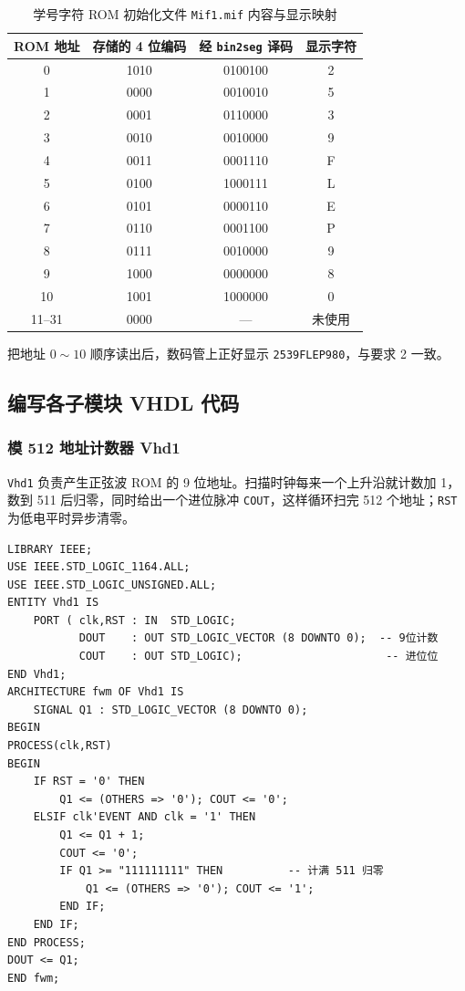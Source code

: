 \documentclass{ctexrep}
\begin{document}
\begin{table}[H]
    \centering
    \caption{学号字符 ROM 初始化文件 \texttt{Mif1.mif} 内容与显示映射}
    \label{e5:tab:xuehaomif}
    \begin{tabular}{cccc}
        \toprule
        \textbf{ROM 地址} & \textbf{存储的 4 位编码} & \textbf{经 \texttt{bin2seg} 译码} & \textbf{显示字符} \\
        \midrule
        0  & 1010 & 0100100 & 2 \\
        1  & 0000 & 0010010 & 5 \\
        2  & 0001 & 0110000 & 3 \\
        3  & 0010 & 0010000 & 9 \\
        4  & 0011 & 0001110 & F \\
        5  & 0100 & 1000111 & L \\
        6  & 0101 & 0000110 & E \\
        7  & 0110 & 0001100 & P \\
        8  & 0111 & 0010000 & 9 \\
        9  & 1000 & 0000000 & 8 \\
        10 & 1001 & 1000000 & 0 \\
        11--31 & 0000 & --- & 未使用 \\
        \bottomrule
    \end{tabular}
\end{table}

把地址 $0\sim10$ 顺序读出后，数码管上正好显示 \texttt{2539FLEP980}，与要求 2 一致。

\subsection{编写各子模块 VHDL 代码}

\subsubsection{模 512 地址计数器 Vhd1}

\texttt{Vhd1} 负责产生正弦波 ROM 的 9 位地址。扫描时钟每来一个上升沿就计数加 1，数到 511 后归零，同时给出一个进位脉冲 \texttt{COUT}，这样循环扫完 512 个地址；\texttt{RST} 为低电平时异步清零。

\begin{verbatim}
LIBRARY IEEE;
USE IEEE.STD_LOGIC_1164.ALL;
USE IEEE.STD_LOGIC_UNSIGNED.ALL;
ENTITY Vhd1 IS
    PORT ( clk,RST : IN  STD_LOGIC;
           DOUT    : OUT STD_LOGIC_VECTOR (8 DOWNTO 0);  -- 9位计数
           COUT    : OUT STD_LOGIC);                      -- 进位位
END Vhd1;
ARCHITECTURE fwm OF Vhd1 IS
    SIGNAL Q1 : STD_LOGIC_VECTOR (8 DOWNTO 0);
BEGIN
PROCESS(clk,RST)
BEGIN
    IF RST = '0' THEN
        Q1 <= (OTHERS => '0'); COUT <= '0';
    ELSIF clk'EVENT AND clk = '1' THEN
        Q1 <= Q1 + 1;
        COUT <= '0';
        IF Q1 >= "111111111" THEN          -- 计满 511 归零
            Q1 <= (OTHERS => '0'); COUT <= '1';
        END IF;
    END IF;
END PROCESS;
DOUT <= Q1;
END fwm;
\end{verbatim}
\label{e5:lst:vhd1}
\end{document}
